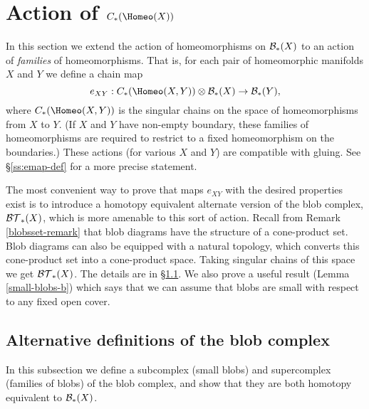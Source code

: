 
\section{Action of \texorpdfstring{$\CH{X}$}{C*(Homeo(M))}}
\label{sec:evaluation}

In this section we extend the action of homeomorphisms on ${\mathcal B}_*(X)$
to an action of {\it families} of homeomorphisms.
That is, for each pair of homeomorphic manifolds $X$ and $Y$
we define a chain map
\[
    e_{XY} : \CH{X, Y} \otimes \bc_*(X) \to \bc_*(Y) ,
\]
where $C_*(\Homeo(X, Y))$ is the singular chains on the space
of homeomorphisms from $X$ to $Y$.
(If $X$ and $Y$ have non-empty boundary, these families of homeomorphisms
are required to restrict to a fixed homeomorphism on the boundaries.)
These actions (for various $X$ and $Y$) are compatible with gluing.
See \S \ref{ss:emap-def} for a more precise statement.

The most convenient way to prove that maps $e_{XY}$ with the desired properties exist is to 
introduce a homotopy equivalent alternate version of the blob complex, ${\mathcal{BT}}_*(X)$,
which is more amenable to this sort of action.
Recall from Remark \ref{blobsset-remark} that blob diagrams
have the structure of a cone-product set.
Blob diagrams can also be equipped with a natural topology, which converts this
cone-product set into a cone-product space.
Taking singular chains of this space we get ${\mathcal{BT}}_*(X)$.
The details are in \S \ref{ss:alt-def}.
We also prove a useful result (Lemma \ref{small-blobs-b}) which says that we can assume that
blobs are small with respect to any fixed open cover.



%


\subsection{Alternative definitions of the blob complex}
\label{ss:alt-def}

\newcommand\sbc{\bc^{\cU}}

In this subsection we define a subcomplex (small blobs) and supercomplex (families of blobs)
of the blob complex, and show that they are both homotopy equivalent to ${\mathcal B}_*(X)$.

